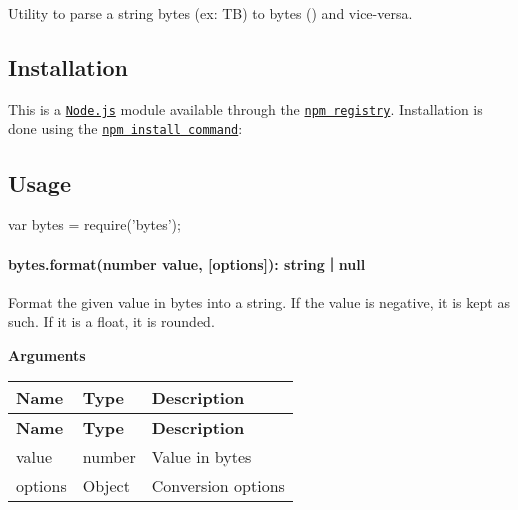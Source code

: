 \href{https://npmjs.org/package/bytes}{\tt } \href{https://npmjs.org/package/bytes}{\tt } \href{https://travis-ci.org/visionmedia/bytes.js}{\tt } \href{https://coveralls.io/r/visionmedia/bytes.js?branch=master}{\tt }

Utility to parse a string bytes (ex\+: {\+TB}) to bytes ({}) and vice-\/versa.

\subsection*{Installation}

This is a \href{https://nodejs.org/en/}{\tt Node.\+js} module available through the \href{https://www.npmjs.com/}{\tt npm registry}. Installation is done using the \href{https://docs.npmjs.com/getting-started/installing-npm-packages-locally}{\tt {\ttfamily npm install} command}\+:




\subsection*{Usage}


\begin{DoxyCode}
var bytes = require('bytes');
\end{DoxyCode}


\paragraph*{bytes.\+format(number value, \mbox{[}options\mbox{]})\+: string｜null}

Format the given value in bytes into a string. If the value is negative, it is kept as such. If it is a float, it is rounded.

{\bfseries Arguments}

\tabulinesep=1mm
\begin{longtabu} spread 0pt [c]{*{3}{|X[-1]}|}
\hline
\rowcolor{\tableheadbgcolor}\textbf{ Name  }&\textbf{ Type  }&\textbf{ Description   }\\
\endfirsthead
\hline
\endfoot
\hline
\rowcolor{\tableheadbgcolor}\textbf{ Name  }&\textbf{ Type  }&\textbf{ Description   }\\
\endhead
value  &{\ttfamily number}  &Value in bytes   \\
options  &{\ttfamily Object}  &Conversion options   \\
\end{longtabu}


